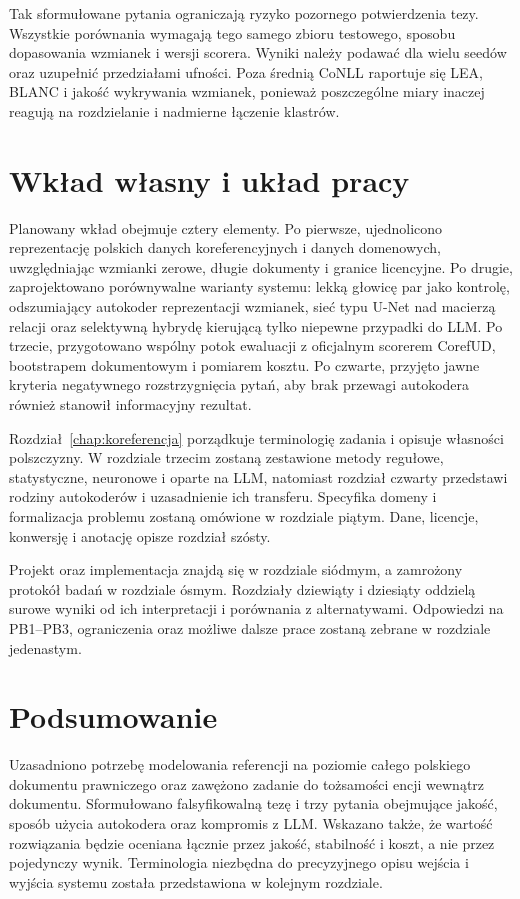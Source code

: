 Tak sformułowane pytania ograniczają ryzyko pozornego potwierdzenia tezy. Wszystkie porównania wymagają tego samego zbioru testowego, sposobu dopasowania wzmianek i wersji scorera. Wyniki należy podawać dla wielu seedów oraz uzupełnić przedziałami ufności. Poza średnią CoNLL raportuje się LEA, BLANC i jakość wykrywania wzmianek, ponieważ poszczególne miary inaczej reagują na rozdzielanie i nadmierne łączenie klastrów.

\section{Wkład własny i układ pracy}
\label{sec:wklad-uklad}

Planowany wkład obejmuje cztery elementy. Po pierwsze, ujednolicono reprezentację polskich danych koreferencyjnych i danych domenowych, uwzględniając wzmianki zerowe, długie dokumenty i granice licencyjne. Po drugie, zaprojektowano porównywalne warianty systemu: lekką głowicę par jako kontrolę, odszumiający autokoder reprezentacji wzmianek, sieć typu U-Net nad macierzą relacji oraz selektywną hybrydę kierującą tylko niepewne przypadki do LLM. Po trzecie, przygotowano wspólny potok ewaluacji z oficjalnym scorerem CorefUD, bootstrapem dokumentowym i pomiarem kosztu. Po czwarte, przyjęto jawne kryteria negatywnego rozstrzygnięcia pytań, aby brak przewagi autokodera również stanowił informacyjny rezultat.

Rozdział~\ref{chap:koreferencja} porządkuje terminologię zadania i opisuje własności polszczyzny. W rozdziale trzecim zostaną zestawione metody regułowe, statystyczne, neuronowe i oparte na LLM, natomiast rozdział czwarty przedstawi rodziny autokoderów i uzasadnienie ich transferu. Specyfika domeny i formalizacja problemu zostaną omówione w rozdziale piątym. Dane, licencje, konwersję i anotację opisze rozdział szósty.

Projekt oraz implementacja znajdą się w rozdziale siódmym, a zamrożony protokół badań w rozdziale ósmym. Rozdziały dziewiąty i dziesiąty oddzielą surowe wyniki od ich interpretacji i porównania z alternatywami. Odpowiedzi na PB1--PB3, ograniczenia oraz możliwe dalsze prace zostaną zebrane w rozdziale jedenastym.

\section{Podsumowanie}

Uzasadniono potrzebę modelowania referencji na poziomie całego polskiego dokumentu prawniczego oraz zawężono zadanie do tożsamości encji wewnątrz dokumentu. Sformułowano falsyfikowalną tezę i trzy pytania obejmujące jakość, sposób użycia autokodera oraz kompromis z LLM. Wskazano także, że wartość rozwiązania będzie oceniana łącznie przez jakość, stabilność i koszt, a nie przez pojedynczy wynik. Terminologia niezbędna do precyzyjnego opisu wejścia i wyjścia systemu została przedstawiona w kolejnym rozdziale.
